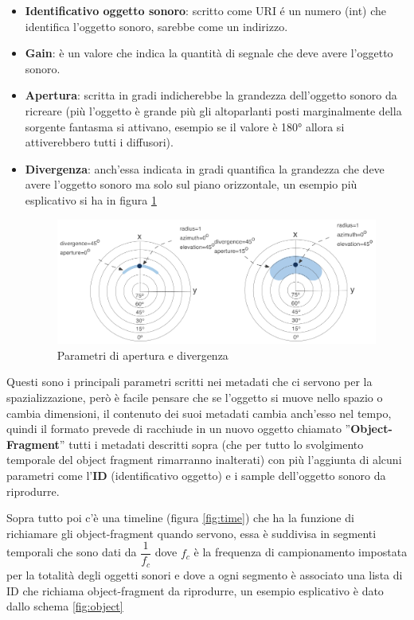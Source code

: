 \documentclass[12pt,a4paper]{report}
\begin{document}
\begin{itemize}
\item \textbf{Identificativo oggetto sonoro}: scritto come URI é un numero (int) che identifica l'oggetto sonoro, sarebbe come un indirizzo.
\item \textbf{Gain}: è un valore che indica la quantità di segnale che deve avere l'oggetto sonoro.
\item \textbf{Apertura}: scritta in gradi indicherebbe la grandezza dell'oggetto sonoro da ricreare (più l'oggetto è grande più gli altoparlanti posti marginalmente della sorgente fantasma si attivano, esempio se il valore è 180° allora si attiverebbero tutti i diffusori).
\item \textbf{Divergenza}: anch'essa indicata in gradi quantifica la grandezza che deve avere l'oggetto sonoro ma solo sul piano orizzontale, un esempio più esplicativo si ha in figura \ref{fig:apertura}

	\begin{figure}[htbp]
	\centering
	\includegraphics[scale=0.35]{figures/apertura.png}
	\caption {Parametri di apertura e divergenza}
	\label{fig:apertura}
	\end{figure}


\end{itemize}

Questi sono i principali parametri scritti nei metadati che ci servono per la spazializzazione, però è facile pensare che se l'oggetto si muove nello spazio o cambia dimensioni, il contenuto dei suoi metadati cambia anch'esso nel tempo, quindi il formato prevede di racchiude in un nuovo oggetto chiamato ''\textbf{Object-Fragment}'' tutti i metadati descritti sopra (che per tutto lo svolgimento temporale del object fragment rimarranno inalterati) con più l'aggiunta di alcuni parametri come l'\textbf{ID} (identificativo oggetto) e i sample dell'oggetto sonoro da riprodurre.

Sopra tutto poi c'è una timeline (figura \ref{fig:time}) che ha la funzione di richiamare gli object-fragment quando servono, essa è suddivisa in segmenti temporali che sono dati da $\dfrac{1}{f_c}$ dove $f_c$ è la frequenza di campionamento impostata per la totalità degli oggetti sonori e dove a ogni segmento è associato una lista di ID che richiama object-fragment da riprodurre, un esempio esplicativo è dato dallo schema \ref{fig:object}
\end{document}
